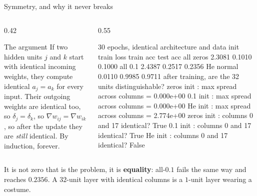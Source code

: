\documentclass[aspectratio=169]{beamer}
\begin{document}
\begin{frame}[fragile,shrink=6]{Symmetry, and why it never breaks}
  \begin{columns}[T]
    \begin{column}{0.42\textwidth}
      \begin{block}{The argument}
        If two hidden units $j$ and $k$ start with identical incoming
        weights, they compute identical $a_j = a_k$ for every input. Their
        outgoing weights are identical too, so
        $\delta_j = \delta_k$, so
        $\nabla w_{ij} = \nabla w_{ik}$, so after the update they are
        \emph{still} identical. By induction, forever.
      \end{block}
    \end{column}
    \begin{column}{0.55\textwidth}
\begin{outblk}
30 epochs, identical architecture and data
  init            train loss  train acc  test acc
  all zeros         2.3081      0.1010     0.1000
  all 0.1           2.4387      0.2517     0.2356
  He normal         0.0110      0.9985     0.9711
after training, are the 32 units distinguishable?
  zeros init : max spread across columns = 0.000e+00
  0.1   init : max spread across columns = 0.000e+00
  He    init : max spread across columns = 2.774e+00
  zeros init : columns 0 and 17 identical? True
  0.1   init : columns 0 and 17 identical? True
  He    init : columns 0 and 17 identical? False
\end{outblk}
    \end{column}
  \end{columns}
  \vspace{0.2em}
  \begin{center}\small
    It is not zero that is the problem, it is \textbf{equality}: all-$0.1$
    fails the same way and reaches $0.2356$. A $32$-unit layer with identical
    columns is a $1$-unit layer wearing a costume.
  \end{center}
\end{frame}
\end{document}
